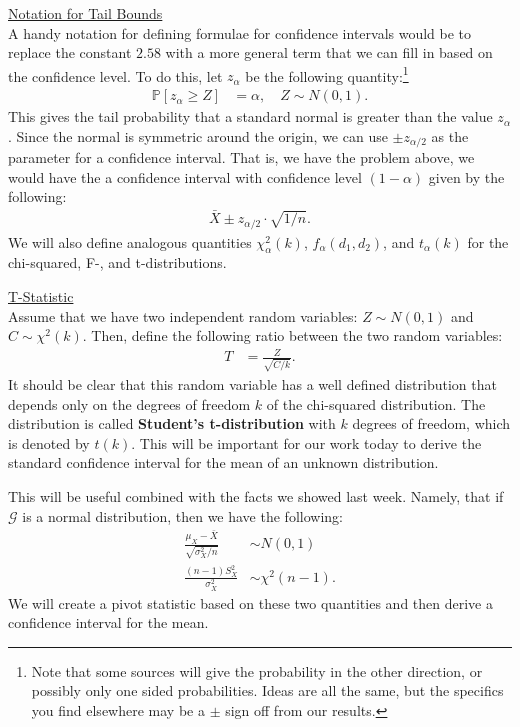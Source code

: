 \documentclass{tufte-handout}
\newcommand{\Prob}{\mathbb{P}}
\begin{document}
\newpage

\noindent
\underline{Notation for Tail Bounds} \\
A handy notation for defining formulae for confidence intervals would be to
replace the constant $2.58$ with a more general term that we can fill in based
on the confidence level. To do this, let $z_{\alpha}$ be the following
quantity:\footnote{
  Note that some sources will give the probability in the other direction,
  or possibly only one sided probabilities. Ideas are all the same, but the
  specifics you find elsewhere may be a $\pm$ sign off from our results.
}
\begin{align*}
\Prob[z_{\alpha} \geq Z ] &= \alpha, \quad Z \sim N(0, 1).
\end{align*}
This gives the tail probability that a standard normal is greater than the value
$z_{\alpha}$. Since the normal is symmetric around the origin, we can use 
$\pm z_{\alpha/2}$ as the parameter for a confidence interval. That is, we 
have the problem above, we would have the a confidence interval with 
confidence level $(1-\alpha)$ given by the following:
\begin{align*}
\bar{X} \pm z_{\alpha/2} \cdot \sqrt{1/n}.
\end{align*}
We will also define analogous quantities $\chi_\alpha^2(k)$, $f_\alpha(d_1, d_2)$,
and $t_\alpha(k)$ for the chi-squared, F-, and t-distributions.

\vspace*{20pt}

\noindent
\underline{T-Statistic} \\
Assume that we have two independent random variables: $Z \sim N(0, 1)$ and
$C \sim \chi^2(k)$. Then, define the following ratio between the two random
variables:
\begin{align*}
T &= \frac{Z}{\sqrt{C / k}}.
\end{align*} 
It should be clear that this random variable has a well defined distribution that
depends only on the degrees of freedom $k$ of the chi-squared distribution. The
distribution is called \textbf{Student's t-distribution} with $k$ degrees of freedom,
which is denoted by $t(k)$. This will be important for our work today to derive the
standard confidence interval for the mean of an unknown distribution.

This will be useful combined with the facts we showed last week. Namely,
that  if $\mathcal{G}$ is a normal distribution, then we have the following:
\begin{align*}
\frac{\mu_X - \bar{X}}{\sqrt{\sigma_X^2 / n}}  &\sim N(0, 1) \\
\frac{(n-1)S^2_X}{\sigma_X^2} &\sim \chi^2(n-1).
\end{align*}
We will create a pivot statistic based on these two quantities and then derive
a confidence interval for the mean.
\end{document}
